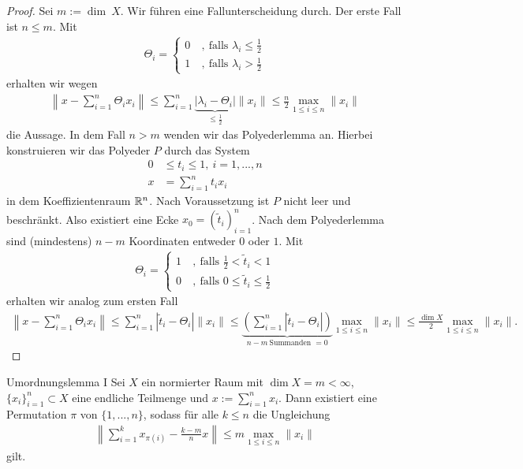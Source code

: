 \begin{proof}
	Sei $ m := \dim \ X $.
	Wir führen eine Fallunterscheidung durch.
	Der erste Fall ist $ n \leq m $. Mit 
	\begin{align*}
		\Theta_i = 
		\begin{cases}
			0 \ &, \ \text{falls } \lambda_i \leq \frac{1}{2}\\
			1 \ &, \ \text{falls } \lambda_i > \frac{1}{2}
		\end{cases}
	\end{align*}
	erhalten wir wegen
	\begin{align*}
		\left\| x - \sum \limits_{i=1}^n \Theta_i x_i \right\|
		\leq
		\sum \limits_{i=1}^n\underbrace{|\lambda_i -\Theta_i|}_{\leq \frac{1}{2}} \|x_i \| 
		\leq \frac{n}{2} \max_{1 \leq i \leq n} \| x_i \|
	\end{align*}
	die Aussage. In dem Fall $ n > m $ wenden wir das Polyederlemma an.	Hierbei konstruieren wir das Polyeder $ P $ durch das System
	\begin{align*}
		0 &\leq t_i \leq 1 , \ i = 1,...,n\\
		x &= 
		\sum_{i =1}^n t_i x_i
	\end{align*}
	in dem Koeffizientenraum $ \mathbb{R}^n $. 
	Nach Voraussetzung ist $ P  $ nicht leer und beschränkt. 
	Also existiert eine Ecke $ x_0 = (\tilde{t}_i)_{i=1}^n $.
	Nach dem Polyederlemma sind (mindestens) $ n - m $ Koordinaten entweder $ 0 $ oder $ 1 $.
	Mit 
	\begin{align*}
		\Theta_i = 
		\begin{cases}
			1 \ &, \ \text{falls } \frac{1}{2} <\tilde{t}_i < 1\\
			0 \ &, \ \text{falls } 0 \leq  \tilde{t}_i \leq \frac{1}{2}
		\end{cases}
	\end{align*}
	erhalten wir analog zum ersten Fall
	\begin{align*}
		\left\| x - \sum \limits_{i=1}^n \Theta_i x_i \right\|
		\leq
		\sum \limits_{i=1}^n|\tilde{t}_i -\Theta_i| \|x_i \| 
		\leq
		\underbrace{\left(\sum \limits_{i=1}^n|\tilde{t}_i -\Theta_i| \right) }_{n-m \ \textrm{Summanden } = 0}
		\max_{1 \leq i \leq n} \| x_i \|
		\leq
		\frac{\dim  X}{2} \max_{1 \leq i \leq n} \| x_i \|.
	\end{align*}
\end{proof}

\begin{genericthm}{Umordnungslemma I}\label{thm:rearrangment_lemma}
	Sei $ X $ ein normierter Raum mit $ \dim X = m < \infty $, $ \{ x_i \}_{i = 1}^n \subset X $ eine endliche Teilmenge und $ x := \sum_{i = 1}^n x_i$.
	Dann existiert eine Permutation $ \pi $ von $ \{1,...,n\} $, sodass für alle $ k \leq n $ die Ungleichung
	\begin{align}\label{eq:rearrangment_lemma_inequality}
		\left\|
		\sum \limits_{i = 1}^k x_{\pi(i)} - \frac{k-m}{n} x 
		\right\|
		\leq 
		m \max \limits_{1 \leq i \leq n } \| x_i \|
	\end{align}
	gilt.
\end{genericthm}

